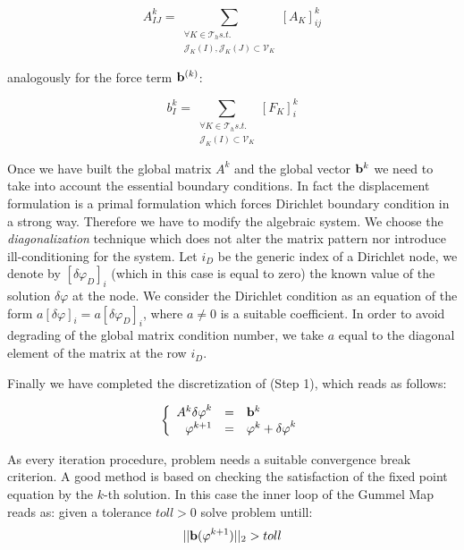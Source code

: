 \begin{equation}
A_{IJ}^k = \sum_{\substack{\forall K \in \mathcal{T}_h s.t. \\ \mathcal{J}_K(I),\mathcal{J}_K(J) \subset \mathcal{V}_K}}
 [A_K]_{ij}^k
\end{equation}

analogously for the force term $\mathbf{b}^{(k)}$:

\begin{equation}
b_{I}^k = \sum_{\substack{\forall K \in \mathcal{T}_h s.t. \\ \mathcal{J}_K(I) \subset \mathcal{V}_K}}
 [F_K]_{i}^k
\end{equation}

Once we have built the global matrix $A^k$ and the global vector $\mathbf{b}^k$ we need to take into account the essential boundary conditions. In fact the displacement formulation is a primal formulation which forces Dirichlet boundary condition in a strong way. Therefore we have to modify the algebraic system. We choose the \textit{diagonalization} technique which does not alter the matrix pattern nor introduce ill-conditioning for the system.  Let $i_D$ be the generic index of a Dirichlet node, we denote by $[\delta \varphi_{D}]_i$ (which in this case is equal to zero) the known value of the solution $\delta \varphi $ at the node. We consider the Dirichlet condition as an equation of the form $a [\delta \varphi]_i = a [\delta \varphi_{D}]_i$, where $a\neq 0$ is a suitable coefficient. In order to avoid degrading of the global matrix condition number, we take $a$ equal to the diagonal element of the matrix at the row  $i_D$.

Finally we have completed the discretization of (Step 1), which reads as follows:

\begin{equation}
\label{eq: NLP discretizated}
\left\{
\begin{array}{rcl}
A^k\mathbf{\delta \varphi}^k & = & \mathbf{b}^k \\
\mathbf{\varphi}^{k+1} & = & \mathbf{\varphi}^k +  \mathbf{\delta \varphi}^k 
\end{array}
\right.
\end{equation}

As every iteration procedure, problem  needs a suitable convergence break criterion. A good method is based on checking the satisfaction of the fixed point equation  by the $k$-th solution. In this case the inner loop of the Gummel Map reads as: given a tolerance $toll>0$ solve problem  untill:
\begin{equation}
||\mathbf{b}(\varphi^{k+1})||_2 > toll
\end{equation}

